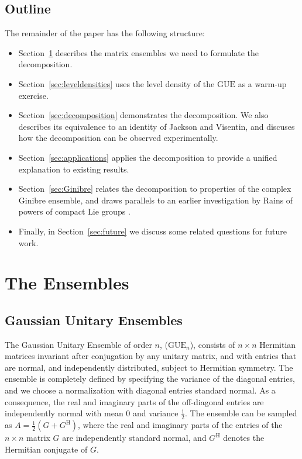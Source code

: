 \documentclass[pdftex, oneside, 10pt, letterpaper]{amsart}
\theoremstyle{plain}
\theoremstyle{definition}
\theoremstyle{remark}
\begin{document}
\subsection*{Outline}
The remainder of the paper has the following structure:
\begin{itemize}
\item Section~\ref{sec:definitions} describes the matrix
  ensembles we need to formulate the decomposition.
\item Section~\ref{sec:leveldensities} uses the level density of the
  {\ensuremath{\mathrm{GUE}}}{} as a warm-up exercise.
\item Section~\ref{sec:decomposition} demonstrates the decomposition.
  We also describes its equivalence to an identity of Jackson and
  Visentin, and discuses how the decomposition can be observed
  experimentally.
\item Section~\ref{sec:applications} applies the decomposition to
  provide a unified explanation to existing results.
  
  
  
\item Section~\ref{sec:Ginibre} relates the decomposition to
  properties of the complex Ginibre ensemble, and draws parallels to
  an earlier investigation by Rains of powers of compact Lie groups
  \cite{Rains-Powers, Rains-power-images}.
\item Finally, in Section~\ref{sec:future} we discuss some related questions
  for future work.
\end{itemize}

\section{The Ensembles}\label{sec:definitions}

\subsection*{Gaussian Unitary Ensembles}\label{sec:GUE}

The Gaussian Unitary Ensemble of order $n$, (${\ensuremath{\mathrm{GUE}}}_{n}$), consists of
$n\times{}n$ Hermitian matrices invariant after conjugation by any
unitary matrix, and with entries that are normal, and independently
distributed, subject to Hermitian symmetry.  The ensemble is
completely defined by specifying the variance of the diagonal entries,
and we choose a normalization with diagonal entries standard normal.
As a consequence, the real and imaginary parts of the off-diagonal
entries are independently normal with mean $0$ and variance $\frac12$.
The ensemble can be sampled as $A=\frac{1}{2}(G+G^{\mathrm{H}})$, where the
real and imaginary parts of the entries of the $n\times{}n$ matrix $G$
are independently standard normal, and $G^{\mathrm{H}}$ denotes the
Hermitian conjugate of $G$.
\end{document}
